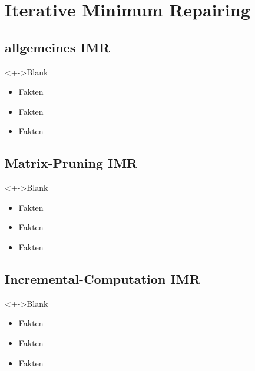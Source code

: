 \section{Iterative Minimum Repairing}

\subsection{allgemeines IMR}

\begin{frame}{\insertsubsection}
  \begin{block}<+->{Blank}
    \begin{itemize}
      \item Fakten
      \item Fakten
      \item Fakten
    \end{itemize}
  \end{block}
\end{frame}

\subsection{Matrix-Pruning IMR}

\begin{frame}{\insertsubsection}
  \begin{block}<+->{Blank}
    \begin{itemize}
      \item Fakten
      \item Fakten
      \item Fakten
    \end{itemize}
  \end{block}
\end{frame}

\subsection{Incremental-Computation IMR}

\begin{frame}{\insertsubsection}
  \begin{block}<+->{Blank}
    \begin{itemize}
      \item Fakten
      \item Fakten
      \item Fakten
    \end{itemize}
  \end{block}
\end{frame}

